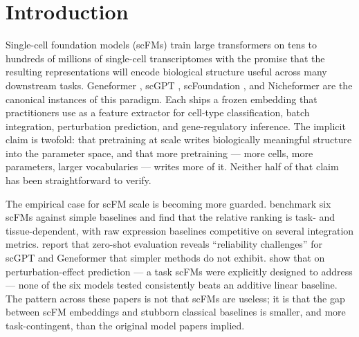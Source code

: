 \documentclass[10pt]{article}
\begin{document}
\section{Introduction}\label{introduction}

Single-cell foundation models (scFMs) train large transformers on tens
to hundreds of millions of single-cell transcriptomes with the promise
that the resulting representations will encode biological structure
useful across many downstream tasks. Geneformer \citep{theodoris2023},
scGPT \citep{cui2024}, scFoundation \citep{hao2024scfoundation}, and Nicheformer
\citep{schaar2025nicheformer} are the canonical instances of this paradigm. Each
ships a frozen embedding that practitioners use as a feature extractor
for cell-type classification, batch integration, perturbation
prediction, and gene-regulatory inference. The implicit claim is
twofold: that pretraining at scale writes biologically meaningful
structure into the parameter space, and that more pretraining --- more
cells, more parameters, larger vocabularies --- writes more of it.
Neither half of that claim has been straightforward to verify.

The empirical case for scFM scale is becoming more guarded. \citet{boiarsky2025} benchmark six scFMs against simple baselines and find that
the relative ranking is task- and tissue-dependent, with raw expression
baselines competitive on several integration metrics. \citet{kedzierska2025} report that zero-shot evaluation reveals ``reliability
challenges'' for scGPT and Geneformer that simpler methods do not
exhibit. \citet{ahlmanneltze2025perturbation} show that on
perturbation-effect prediction --- a task scFMs were explicitly designed
to address --- none of the six models tested consistently beats an
additive linear baseline. The pattern across these papers is not that
scFMs are useless; it is that the gap between scFM embeddings and
stubborn classical baselines is smaller, and more task-contingent, than
the original model papers implied.
\end{document}
